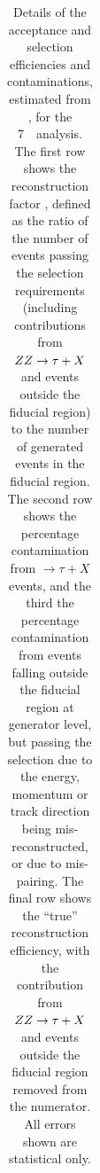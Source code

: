 \begin{table}[htbp]
\begin{tabular}{p{3.5cm}llll}
	\hline\hline
    \end{tabular}
    \caption[Details of the acceptance and selection
    efficiencies and contaminations for the 7~\tev\ analysis.]{Details of the acceptance and selection
    efficiencies and contaminations, estimated from \mc, for the 7~\tev\ analysis. The first row shows the 
    reconstruction factor \CZZ, defined as the ratio of the number of events
    passing the selection requirements (including contributions from $ZZ
    \rightarrow \tau+X$ and events outside the fiducial region) to the number
    of generated events in the fiducial region.  The second row shows the
    percentage contamination from $\rightarrow \tau+X$ events, and the third
    the percentage contamination from events falling outside the fiducial
    region at generator level, but passing the selection due to the energy,
    momentum or track direction being mis-reconstructed, or due to mis-pairing.  The final row shows
    the ``true'' reconstruction efficiency, with the contribution from $ZZ
    \rightarrow \tau+X$ and events outside the fiducial region removed from the
    numerator.  All errors shown are statistical only.}
    \label{table:objSel-czz-seven}
\end{table}

